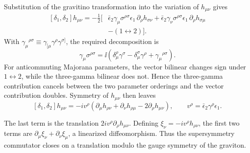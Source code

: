 \begin{enumerate}
Substitution of the gravitino transformation into the variation of
  \(h_{\mu\nu}\) gives
  \[
  \begin{aligned}
    [\delta_1,\delta_2]h_{\mu\nu}
      =-\frac12\big[
       &\bar\epsilon_2\gamma_\mu\sigma^{\rho\sigma}\epsilon_1\,
          \partial_\rho h_{\sigma\nu}
        +\bar\epsilon_2\gamma_\nu\sigma^{\rho\sigma}\epsilon_1\,
          \partial_\rho h_{\sigma\mu}\\
       &-(1\leftrightarrow2)\big].
  \end{aligned}
  \]
  With
  \(\gamma_\mu{}^{\rho\sigma}
    \equiv\gamma_{[\mu}\gamma^\rho\gamma^{\sigma]}\), the required
  decomposition is
  \[
    \gamma_\mu\sigma^{\rho\sigma}
      =\ii\left(
        \delta_\mu^\rho\gamma^\sigma
        -\delta_\mu^\sigma\gamma^\rho
        +\gamma_\mu{}^{\rho\sigma}\right).
  \]
  For anticommuting Majorana parameters, the vector bilinear changes sign
  under \(1\leftrightarrow2\), while the three-gamma bilinear does not.
  Hence the three-gamma contribution cancels between the two parameter
  orderings and the vector contribution doubles.  Symmetry of
  \(h_{\mu\nu}\) then leaves
  \[
    [\delta_1,\delta_2]h_{\mu\nu}
      =-iv^\rho
        \left(\partial_\mu h_{\rho\nu}
              +\partial_\nu h_{\rho\mu}
              -2\partial_\rho h_{\mu\nu}\right),
    \qquad
    v^\rho=\bar\epsilon_2\gamma^\rho\epsilon_1 .
  \]

  The last term is the translation
  \(2iv^\rho\partial_\rho h_{\mu\nu}\).  Defining
  \(\xi_\nu=-iv^\rho h_{\rho\nu}\), the first two terms are
  \(\partial_\mu\xi_\nu+\partial_\nu\xi_\mu\), a linearized
  diffeomorphism.  Thus the supersymmetry commutator closes on a translation
  modulo the gauge symmetry of the graviton.


\end{enumerate}
